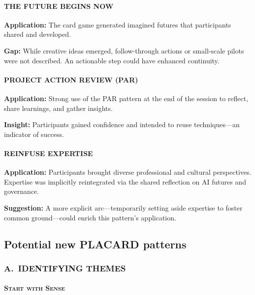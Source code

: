 \documentclass[acmlarge,timestamp]{acmart}
\begin{document}
\paragraph*{THE FUTURE BEGINS NOW}

\noindent \textbf{Application:} The card game generated imagined futures that participants shared and developed.

\noindent \textbf{Gap:} While creative ideas emerged, follow-through actions or small-scale pilots were not described. An actionable step could have enhanced continuity.

\paragraph*{PROJECT ACTION REVIEW (PAR)}

\noindent \textbf{Application:} Strong use of the PAR pattern at the end of the session to reflect, share learnings, and gather insights.

\noindent \textbf{Insight:} Participants gained confidence and intended to reuse techniques—an indicator of success.

\paragraph*{REINFUSE EXPERTISE}

\noindent \textbf{Application:} Participants brought diverse professional and cultural perspectives. Expertise was implicitly reintegrated via the shared reflection on AI futures and governance.

\noindent \textbf{Suggestion:} A more explicit arc—temporarily setting aside expertise to foster common ground—could enrich this pattern’s application.

\subsection*{Potential new PLACARD patterns}

\subsubsection*{A.~IDENTIFYING THEMES}

\paragraph*{{\scshape Start with Sense}}
\end{document}
